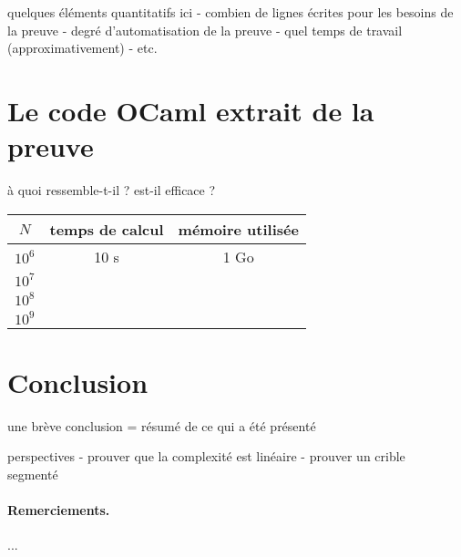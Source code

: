 \documentclass[a4paper]{easychair}
\begin{document}
quelques éléments quantitatifs ici
- combien de lignes écrites pour les besoins de la preuve
- degré d'automatisation de la preuve
- quel temps de travail (approximativement)
- etc.

\section{Le code OCaml extrait de la preuve}

à quoi ressemble-t-il ?
est-il efficace ?

\begin{center}
  \begin{tabular}{|c|c|c|}
    \hline
    $N$ & temps de calcul & mémoire utilisée \\
    \hline\hline
    $10^6$ & 10 s & 1 Go \\\hline
    $10^7$ & \\\hline
    $10^8$ & \\\hline
    $10^9$ & \\\hline
  \end{tabular}
\end{center}

\section{Conclusion}
\label{sec:conclusion}

une brève conclusion = résumé de ce qui a été présenté

perspectives
- prouver que la complexité est linéaire
- prouver un crible segmenté~\cite{crible-segmente}


\paragraph{Remerciements.} ...



\end{document}
